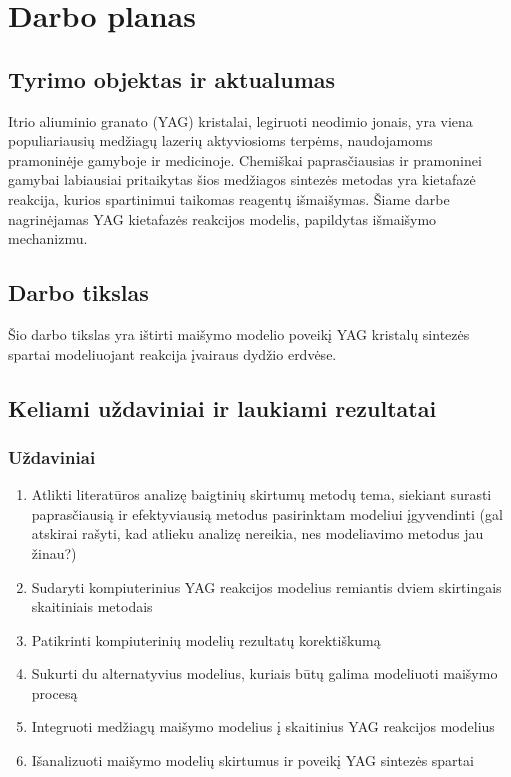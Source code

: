 \documentclass[]{VUMIFTemplateClass}
\begin{document}

\onehalfspacing


\section{Darbo planas}

\subsection{Tyrimo objektas ir aktualumas}

Itrio aliuminio granato (YAG) kristalai, legiruoti neodimio jonais, yra viena populiariausių medžiagų lazerių aktyviosioms terpėms, naudojamoms pramoninėje gamyboje ir medicinoje. Chemiškai paprasčiausias ir pramoninei gamybai labiausiai pritaikytas šios medžiagos sintezės metodas yra kietafazė reakcija, kurios spartinimui taikomas reagentų išmaišymas. Šiame darbe nagrinėjamas YAG kietafazės reakcijos modelis, papildytas išmaišymo mechanizmu.

\subsection{Darbo tikslas}

Šio darbo tikslas yra ištirti maišymo modelio poveikį YAG kristalų sintezės spartai modeliuojant reakcija įvairaus dydžio erdvėse.

\subsection{Keliami uždaviniai ir laukiami rezultatai}
\subsubsection{Uždaviniai}
\begin{enumerate}
    \item Atlikti literatūros analizę baigtinių skirtumų metodų tema, siekiant surasti paprasčiausią ir efektyviausią metodus pasirinktam modeliui įgyvendinti (gal atskirai rašyti, kad atlieku analizę nereikia, nes modeliavimo metodus jau žinau?)
    \item Sudaryti kompiuterinius YAG reakcijos modelius remiantis dviem skirtingais skaitiniais metodais
    \item Patikrinti kompiuterinių modelių rezultatų korektiškumą
    \item Sukurti du alternatyvius modelius, kuriais būtų galima modeliuoti maišymo procesą
    \item Integruoti medžiagų maišymo modelius į skaitinius YAG reakcijos modelius
    \item Išanalizuoti maišymo modelių skirtumus ir poveikį YAG sintezės spartai
\end{enumerate}
\end{document}
